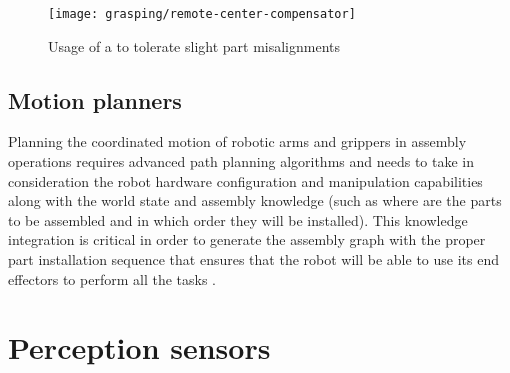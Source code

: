 \begin{figure}[H]
	\centering
	\texttt{[image: grasping/remote-center-compensator]}
	\caption[Usage of a  to tolerate slight part misalignments]{Usage of a  to tolerate slight part misalignments\protect\footnotemark}
	\label{fig:remote-center-compensator}
\end{figure}


\subsection{Motion planners}

Planning the coordinated motion of robotic arms and grippers in assembly operations requires advanced path planning algorithms \cite{Fontanals2014,You2012,mopl2015} and needs to take in consideration the robot hardware configuration and manipulation capabilities along with the world state and assembly knowledge \cite{Tenorth14} (such as where are the parts to be assembled and in which order they will be installed). This knowledge integration is critical in order to generate the assembly graph with the proper part installation sequence that ensures that the robot will be able to use its end effectors to perform all the tasks \cite{Thomas2003ATP,Thomas2011}.





\section{Perception sensors}

